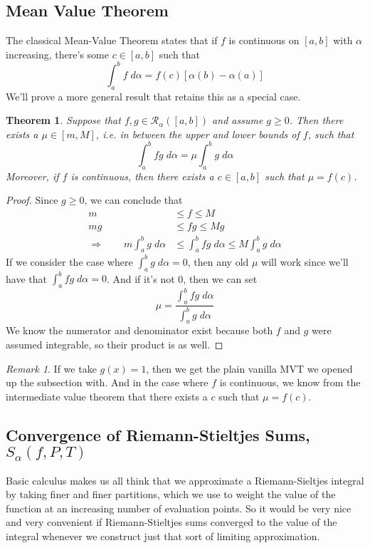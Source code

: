 \documentclass[12pt]{article}
\theoremstyle{plain}
\newtheorem{thm}{Theorem}[subsection]
\theoremstyle{definition}
\theoremstyle{remark}
\newtheorem*{rmk}{Remark}
\begin{document}
\begin{itemize}
\end{itemize}

\newpage
\subsection{Mean Value Theorem}

The classical Mean-Value Theorem states that if $f$ is continuous on $[a,b]$ with $\alpha$ increasing, there's some $c\in[a,b]$ such that 
    \[ \int^b_a f\;d\alpha = f(c)[\alpha(b)-\alpha(a)] \]
We'll prove a more general result that retains this as a special case.
\begin{thm}
\label{mvt}
Suppose that $f,g\in\mathscr{R}_\alpha([a,b])$ and assume $g\geq0$. Then there exists a $\mu\in[m,M]$, i.e. in between the upper and lower bounds of $f$, such that 
        \[ \int^b_a fg\;d\alpha = \mu \int^b_a g\;d\alpha \]
Moreover, if $f$ is continuous, then there exists a $c\in[a,b]$ such that $\mu = f(c)$.
\end{thm}
\begin{proof}
Since $g\geq0$, we can conclude that 
\begin{align*}
    m &\leq f \leq M \\
    mg &\leq fg \leq Mg \\
    \Rightarrow \qquad m\int^b_a g\;d\alpha &\leq 
        \int^b_a fg\;d\alpha \leq  M \int^b_a g\;d\alpha
\end{align*}
If we consider the case where $\int^b_a g\;d\alpha= 0$, then any old $\mu$ will work since we'll have that $\int^b_a fg\;d\alpha=0$. And if it's not 0, then we can set 
\[ \mu = \frac{\int^b_a fg\;d\alpha}{\int^b_a g\;d\alpha} \]
We know the numerator and denominator exist because both $f$ and $g$ were assumed integrable, so their product is as well.
\end{proof}
\begin{rmk}
If we take $g(x)=1$, then we get the plain vanilla MVT we opened up the subsection with.  And in the case where $f$ is continuous, we know from the intermediate value theorem that there exists a $c$ such that $\mu=f(c)$. 
\end{rmk}


\newpage
\subsection{Convergence of Riemann-Stieltjes Sums, $S_\alpha(f,P,T)$}

Basic calculus makes us all think that we approximate a Riemann-Sieltjes integral by taking finer and finer partitions, which we use to weight the value of the function at an increasing number of evaluation points.  So it would be very nice and very convenient if Riemann-Stieltjes sums converged to the value of the integral whenever we construct just that sort of limiting approximation. 
\end{document}
